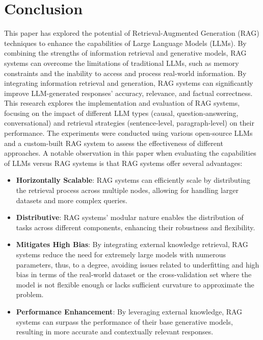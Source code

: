 \documentclass{wseas}
\begin{document}
\section{Conclusion}

This paper has explored the potential of Retrieval-Augmented Generation 
(RAG) techniques to enhance the capabilities of Large Language Models (LLMs).
By combining the strengths of information retrieval and generative models, 
RAG systems can overcome the limitations of traditional LLMs, such as memory
constraints and the inability to access and process real-world information. 
By integrating information retrieval and generation, RAG systems can significantly 
improve LLM-generated responses' accuracy, relevance, and factual correctness.  
This research explores the implementation and evaluation of RAG systems, focusing on 
the impact of different LLM types (causal, question-answering, conversational) and retrieval 
strategies (sentence-level, paragraph-level) on their performance. 
The experiments were conducted using various open-source LLMs and a custom-built RAG system to 
assess the effectiveness of different approaches. A notable observation in this paper when evaluating the capabilities of LLMs versus RAG systems is that RAG systems offer several advantages:
\begin{itemize}
  \item
    \textbf{Horizontally Scalable}: RAG systems can efficiently scale by distributing the retrieval process across multiple nodes, 
    allowing for handling larger datasets and more complex queries.
  \item
    \textbf{Distributive}: RAG systems' modular nature enables the distribution of tasks across different components, 
    enhancing their robustness and flexibility.
  \item
    \textbf{Mitigates High Bias}: By integrating external knowledge retrieval, RAG systems reduce 
    the need for extremely large models with numerous parameters, thus, to a degree, avoiding issues 
    related to underfitting and high bias in terms of the real-world dataset or the cross-validation 
    set where the model is not flexible enough or lacks sufficient curvature to approximate the problem.
  \item
    \textbf{Performance Enhancement}: By leveraging external knowledge, RAG systems can surpass the
    performance of their base generative models, resulting in more accurate and contextually relevant responses.
\end{itemize}
\end{document}
